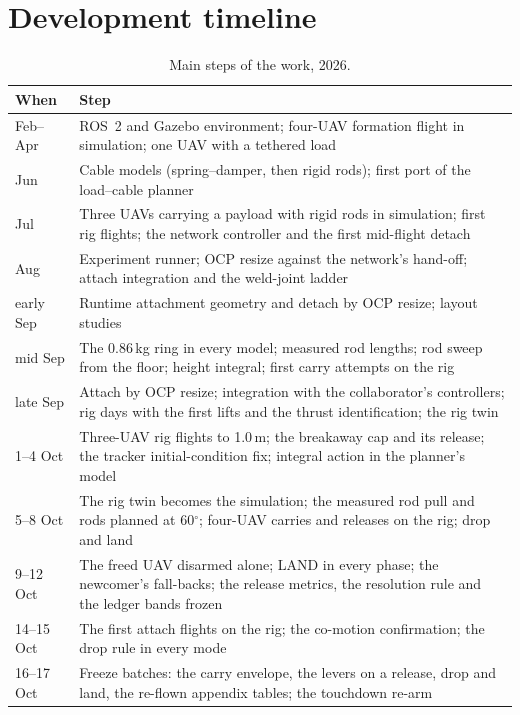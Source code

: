\section{Development timeline}
\label{sec:app_timeline}

\begin{table}[H]
\centering
\small
\caption{Main steps of the work, 2026.}
\label{tab:app_timeline}
\begin{tabularx}{\textwidth}{lX}
\toprule
When & Step \\
\midrule
Feb--Apr & ROS~2 and Gazebo environment; four-UAV formation flight in simulation; one UAV with a tethered load \\
Jun & Cable models (spring--damper, then rigid rods); first port of the load--cable planner \\
Jul & Three UAVs carrying a payload with rigid rods in simulation; first rig flights; the network controller and the first mid-flight detach \\
Aug & Experiment runner; OCP resize against the network's hand-off; attach integration and the weld-joint ladder \\
early Sep & Runtime attachment geometry and detach by OCP resize; layout studies \\
mid Sep & The 0.86\,kg ring in every model; measured rod lengths; rod sweep from the floor; height integral; first carry attempts on the rig \\
late Sep & Attach by OCP resize; integration with the collaborator's controllers; rig days with the first lifts and the thrust identification; the rig twin \\
1--4 Oct & Three-UAV rig flights to 1.0\,m; the breakaway cap and its release; the tracker initial-condition fix; integral action in the planner's model \\
5--8 Oct & The rig twin becomes the simulation; the measured rod pull and rods planned at 60$^\circ$; four-UAV carries and releases on the rig; drop and land \\
9--12 Oct & The freed UAV disarmed alone; LAND in every phase; the newcomer's fall-backs; the release metrics, the resolution rule and the ledger bands frozen \\
14--15 Oct & The first attach flights on the rig; the co-motion confirmation; the drop rule in every mode \\
16--17 Oct & Freeze batches: the carry envelope, the levers on a release, drop and land, the re-flown appendix tables; the touchdown re-arm \\
\bottomrule
\end{tabularx}
\end{table}

